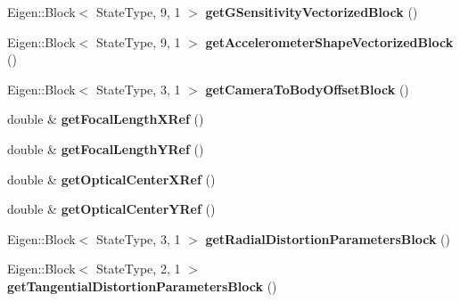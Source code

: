 \begin{DoxyCompactItemize}
\item 
\hypertarget{class_filter_state_a1ab46a729807178faf9b6bebb87aa791}{Eigen\-::\-Block$<$ State\-Type, 9, 1 $>$ {\bfseries get\-G\-Sensitivity\-Vectorized\-Block} ()}\label{class_filter_state_a1ab46a729807178faf9b6bebb87aa791}

\item 
\hypertarget{class_filter_state_a57cb64b2b25132c2da38b0313da415c5}{Eigen\-::\-Block$<$ State\-Type, 9, 1 $>$ {\bfseries get\-Accelerometer\-Shape\-Vectorized\-Block} ()}\label{class_filter_state_a57cb64b2b25132c2da38b0313da415c5}

\item 
\hypertarget{class_filter_state_a844855f0fa5ebf0c606a06ea6fdb460b}{Eigen\-::\-Block$<$ State\-Type, 3, 1 $>$ {\bfseries get\-Camera\-To\-Body\-Offset\-Block} ()}\label{class_filter_state_a844855f0fa5ebf0c606a06ea6fdb460b}

\item 
\hypertarget{class_filter_state_a3b65a9649366c853ffd99784fe9bef72}{double \& {\bfseries get\-Focal\-Length\-X\-Ref} ()}\label{class_filter_state_a3b65a9649366c853ffd99784fe9bef72}

\item 
\hypertarget{class_filter_state_aed71d6cec7d8a101ba10b83f969d28d4}{double \& {\bfseries get\-Focal\-Length\-Y\-Ref} ()}\label{class_filter_state_aed71d6cec7d8a101ba10b83f969d28d4}

\item 
\hypertarget{class_filter_state_a3fc41a17c48851340acbfdfc9c164f01}{double \& {\bfseries get\-Optical\-Center\-X\-Ref} ()}\label{class_filter_state_a3fc41a17c48851340acbfdfc9c164f01}

\item 
\hypertarget{class_filter_state_a7ddf9eca9ab6cad9bee85ee6cfc80de0}{double \& {\bfseries get\-Optical\-Center\-Y\-Ref} ()}\label{class_filter_state_a7ddf9eca9ab6cad9bee85ee6cfc80de0}

\item 
\hypertarget{class_filter_state_aa326b846da2b55623e4d219d357e6b57}{Eigen\-::\-Block$<$ State\-Type, 3, 1 $>$ {\bfseries get\-Radial\-Distortion\-Parameters\-Block} ()}\label{class_filter_state_aa326b846da2b55623e4d219d357e6b57}

\item 
\hypertarget{class_filter_state_ad4b9c49509f2cc303c554969a8264c89}{Eigen\-::\-Block$<$ State\-Type, 2, 1 $>$ {\bfseries get\-Tangential\-Distortion\-Parameters\-Block} ()}\label{class_filter_state_ad4b9c49509f2cc303c554969a8264c89}


\end{DoxyCompactItemize}
